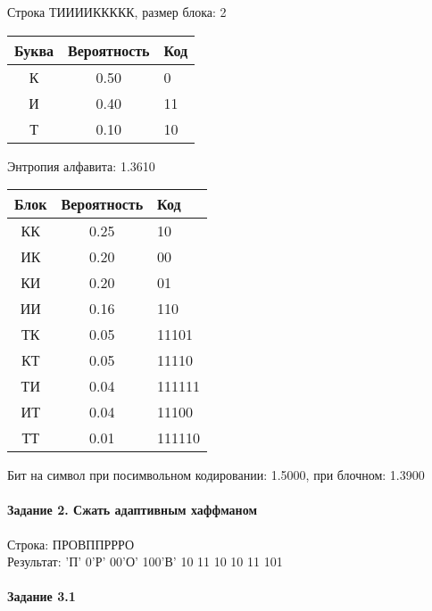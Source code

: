 \documentclass[a4paper, 12pt]{article}
\begin{document}
Строка ТИИИИККККК, размер блока: 2
\begin{center}
 \begin{tabular}{ |c|c|l| } 
  \hline
     Буква & Вероятность & Код\\ \hline
К & 0.50 & 0\\\hline
И & 0.40 & 11\\\hline
Т & 0.10 & 10
\\ \hline \end{tabular}
\end{center}
Энтропия алфавита: 1.3610
\begin{center}
 \begin{tabular}{ |c|c|l| } 
  \hline
     Блок & Вероятность & Код\\ \hline
КК & 0.25 & 10\\\hline
ИК & 0.20 & 00\\\hline
КИ & 0.20 & 01\\\hline
ИИ & 0.16 & 110\\\hline
ТК & 0.05 & 11101\\\hline
КТ & 0.05 & 11110\\\hline
ТИ & 0.04 & 111111\\\hline
ИТ & 0.04 & 11100\\\hline
ТТ & 0.01 & 111110
\\ \hline \end{tabular}
\end{center}
Бит на символ при посимвольном кодировании: 1.5000, при блочном: 1.3900


\pagebreak
\paragraph{Задание 2. Сжать адаптивным хаффманом\\}

Строка: 
ПРОВППРРРО\\
Результат: 'П' 0'Р' 00'О' 100'В' 10 11 10 10 11 101










\pagebreak
\paragraph{Задание 3.1}
\end{document}
